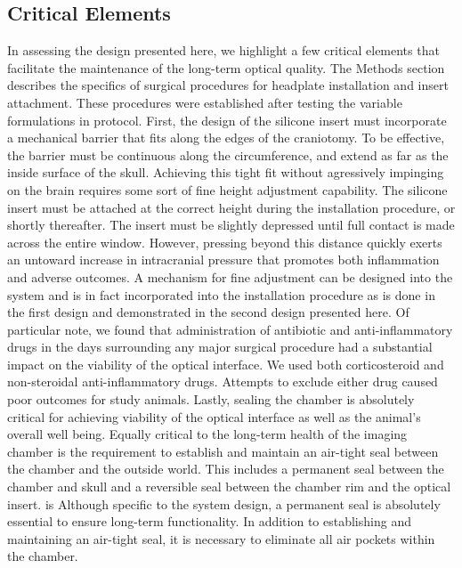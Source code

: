 \subsection{Critical Elements}
\label{sec:critical-elements}

In assessing the design presented here, we highlight a few critical elements that facilitate the maintenance of the long-term optical quality.
The Methods section describes the specifics of surgical procedures for headplate installation and insert attachment.
These procedures were established after testing the variable formulations in protocol.
First, the design of the silicone insert must incorporate a mechanical barrier that fits along the edges of the craniotomy.
To be effective, the barrier must be continuous along the circumference, and extend as far as the inside surface of the skull.
Achieving this tight fit without agressively impinging on the brain requires some sort of fine height adjustment capability.
The silicone insert must be attached at the correct height during the installation procedure, or shortly thereafter.
The insert must be slightly depressed until full contact is made across the entire window.
However, pressing beyond this distance quickly exerts an untoward increase in intracranial pressure that promotes both inflammation and adverse outcomes.
A mechanism for fine adjustment can be designed into the system and is in fact incorporated into the installation procedure as is done in the first design and demonstrated in the second design presented here.
Of particular note, we found that administration of antibiotic and anti-inflammatory drugs in the days surrounding any major surgical procedure had a substantial impact on the viability of the optical interface.
We used both corticosteroid and non-steroidal anti-inflammatory drugs.
Attempts to exclude either drug caused poor outcomes for study animals.
Lastly, sealing the chamber is absolutely critical for achieving viability of the optical interface as well as the animal’s overall well being.
Equally critical to the long-term health of the imaging chamber is the requirement to establish and maintain an air-tight seal between the chamber and the outside world.
This includes a permanent seal between the chamber and skull and a reversible seal between the chamber rim and the optical insert.
is Although specific to the system design, a permanent seal is absolutely essential to ensure long-term functionality.
In addition to establishing and maintaining an air-tight seal, it is necessary to eliminate all air pockets within the chamber.
